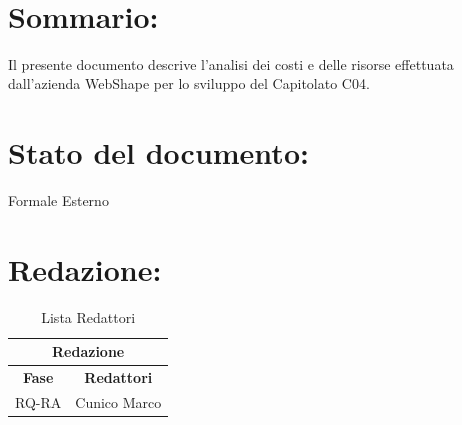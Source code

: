 \begin{center} %
	\begin{Huge}	
				\textbf{\TITOLODOC}
			\\
	\end{Huge}
\end{center}

\section*{\LARGE Sommario:}
Il presente documento descrive l'analisi dei costi e delle risorse effettuata dall'azienda WebShape per lo sviluppo del Capitolato C04.

\indent \indent

\section*{\LARGE Stato del documento:}
\indent \indent
	Formale Esterno

\section*{\LARGE Redazione:}
	\begin{table}[!h]
		\begin{center}
			\begin{tabular}
				{|c|c|}
				\hline
				\multicolumn{2}{|c|}{ \textbf{Redazione} } \\
				\hline
				\textbf{Fase} & \textbf{Redattori} \\
				\hline
				RQ-RA & Cunico Marco \\
				\hline
			\end{tabular}
			\caption{Lista Redattori} %
			\label{tabredazione}
		\end{center}
	\end{table}
	
	
